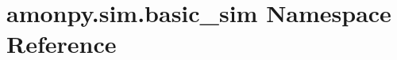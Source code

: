 \hypertarget{namespaceamonpy_1_1sim_1_1basic__sim}{\section{amonpy.\-sim.\-basic\-\_\-sim Namespace Reference}
\label{namespaceamonpy_1_1sim_1_1basic__sim}
}
